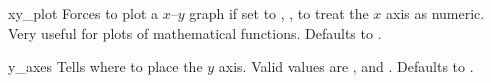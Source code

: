 \begin{AttrDecl}{xy\_plot}
Forces \thisclass to plot a $x$--$y$ graph if set to ,
\ie, to treat the $x$ axis as numeric. Very useful for plots of
mathematical functions. Defaults to .
\end{AttrDecl}

\begin{AttrDecl}{y\_axes}
Tells \thisclass where to place the $y$ axis. Valid
values are ,  and . Defaults
to .
\end{AttrDecl}
